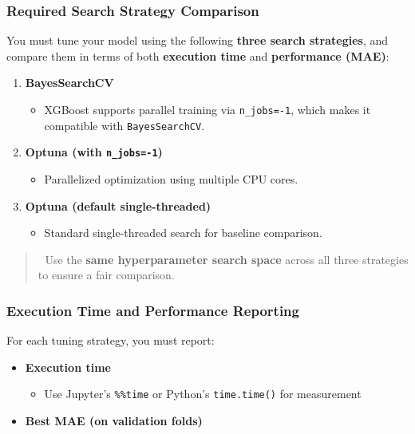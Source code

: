 \documentclass[
  letterpaper,
  DIV=11,
  numbers=noendperiod]{scrreprt}
\providecommand{\tightlist}{%
  \setlength{\itemsep}{0pt}\setlength{\parskip}{0pt}}\usepackage{longtable,booktabs,array}
\begin{document}
\subsubsection{Required Search Strategy
Comparison}\label{required-search-strategy-comparison}

You must tune your model using the following \textbf{three search
strategies}, and compare them in terms of both \textbf{execution time}
and \textbf{performance (MAE)}:

\begin{enumerate}
\def\labelenumi{\arabic{enumi}.}
\tightlist
\item
  \textbf{BayesSearchCV}

  \begin{itemize}
  \tightlist
  \item
    XGBoost supports parallel training via \texttt{n\_jobs=-1}, which
    makes it compatible with \texttt{BayesSearchCV}.
  \end{itemize}
\item
  \textbf{Optuna (with \texttt{n\_jobs=-1})}

  \begin{itemize}
  \tightlist
  \item
    Parallelized optimization using multiple CPU cores.
  \end{itemize}
\item
  \textbf{Optuna (default single-threaded)}

  \begin{itemize}
  \tightlist
  \item
    Standard single-threaded search for baseline comparison.
  \end{itemize}
\end{enumerate}

\begin{quote}
🔁 Use the \textbf{same hyperparameter search space} across all three
strategies to ensure a fair comparison.
\end{quote}

\subsubsection{Execution Time and Performance
Reporting}\label{execution-time-and-performance-reporting}

For each tuning strategy, you must report:

\begin{itemize}
\tightlist
\item
  \textbf{Execution time}

  \begin{itemize}
  \tightlist
  \item
    Use Jupyter's \texttt{\%\%time} or Python's \texttt{time.time()} for
    measurement
  \end{itemize}
\item
  \textbf{Best MAE (on validation folds)}
\end{itemize}
\end{document}
